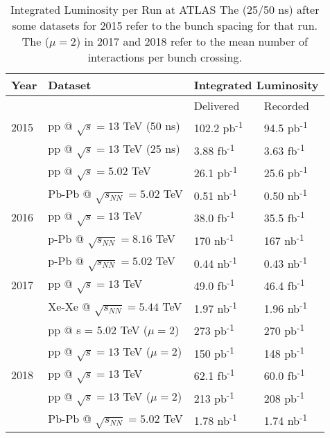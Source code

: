 \begin{table} \centering
\begin{tabular}{|l|l|l|l|}
\hline
Year & Dataset                              & \multicolumn{2}{c|}{Integrated Luminosity}  \\
\hline
     &                                      & Delivered    & Recorded    \\
\hline
2015 & pp @ $\sqrt{s} = 13$ TeV (50 ns)     &  102.2  pb\textsuperscript{-1}   & 94.5  pb\textsuperscript{-1}  \\
     & pp @ $\sqrt{s} = 13$ TeV (25 ns)     &  3.88   fb\textsuperscript{-1}   & 3.63  fb\textsuperscript{-1}  \\
     & pp @ $\sqrt{s} = 5.02$ TeV           &  26.1   pb\textsuperscript{-1}   & 25.6  pb\textsuperscript{-1}  \\
     & Pb-Pb @ $\sqrt{s_{NN}} = 5.02$ TeV   &  0.51   nb\textsuperscript{-1}   &  0.50 nb\textsuperscript{-1}  \\
\hline
2016 & pp @ $\sqrt{s} = 13$ TeV             &  38.0   fb\textsuperscript{-1}   & 35.5  fb\textsuperscript{-1}  \\
     & p-Pb @ $\sqrt{s_{NN}} = 8.16$ TeV    &  170    nb\textsuperscript{-1}   & 167   nb\textsuperscript{-1}  \\
     & p-Pb @ $\sqrt{s_{NN}} = 5.02$ TeV    &  0.44   nb\textsuperscript{-1}   &  0.43 nb\textsuperscript{-1}  \\
\hline
2017 & pp @ $\sqrt{s} = 13$ TeV             &  49.0   fb\textsuperscript{-1}   & 46.4  fb\textsuperscript{-1}  \\
     & Xe-Xe @ $\sqrt{s_{NN}} = 5.44$ TeV   &  1.97   nb\textsuperscript{-1}   &  1.96 nb\textsuperscript{-1}  \\
     & pp @ s = 5.02 TeV ($\mu=2$)          &  273    pb\textsuperscript{-1}   & 270   pb\textsuperscript{-1}  \\
     & pp @ $\sqrt{s} = 13$ TeV ($\mu=2$)   &  150    pb\textsuperscript{-1}   & 148   pb\textsuperscript{-1}  \\
\hline
2018 & pp @ $\sqrt{s} = 13$ TeV             &  62.1   fb\textsuperscript{-1}   & 60.0  fb\textsuperscript{-1}  \\
     & pp @ $\sqrt{s} = 13$ TeV ($\mu=2$)   &  213    pb\textsuperscript{-1}   & 208   pb\textsuperscript{-1}  \\
     & Pb-Pb @ $\sqrt{s_{NN}} = 5.02$ TeV   &  1.78   nb\textsuperscript{-1}   &  1.74 nb\textsuperscript{-1}  \\ 
\hline
\end{tabular}
\caption{
    Integrated Luminosity per Run at ATLAS \cite{data_quality}
    The (25/50 ns) after some datasets for 2015 refer to the bunch spacing for that run.
    The ($\mu=2$) in 2017 and 2018 refer to the mean number of interactions per bunch crossing.
}
\label{tab:dataset_lum}

\end{table}
